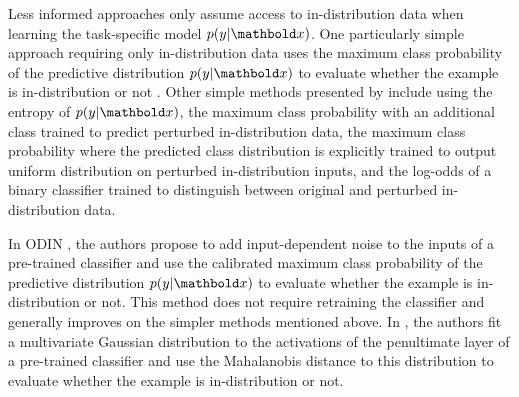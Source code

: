 Less informed approaches only assume access to in-distribution data when learning the task-specific model $p(y|\xb)$. 
One particularly simple approach requiring only in-distribution data uses the maximum class probability of the predictive distribution $p(y|\xb)$ to evaluate whether the example is in-distribution or not \cite{hendrycks_baseline_2017}. 
Other simple methods presented by \textcite{ren_likelihood_2019} include using the entropy of $p(y|\xb)$, the maximum class probability with an additional class trained to predict perturbed in-distribution data, the maximum class probability where the predicted class distribution is explicitly trained to output uniform distribution on perturbed in-distribution inputs, and the log-odds of a binary classifier trained to distinguish between original and perturbed in-distribution data. 

In ODIN \cite{liang_enhancing_2018}, the authors propose to add input-dependent noise to the inputs of a pre-trained classifier and use the calibrated maximum class probability of the predictive distribution $p(y|\xb)$ to evaluate whether the example is in-distribution or not. This method does not require retraining the classifier and generally improves on the simpler methods mentioned above. 
In \textcite{lee_training_2018}, the authors fit a multivariate Gaussian distribution to the activations of the penultimate layer of a pre-trained classifier and use the Mahalanobis distance to this distribution to evaluate whether the example is in-distribution or not. 




